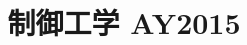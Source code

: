 \documentclass[11pt,a4paper]{article}
\title{制御工学 AY2015}
\author{}
\date{}
\begin{document}
\maketitle


\bigskip

\end{document}
